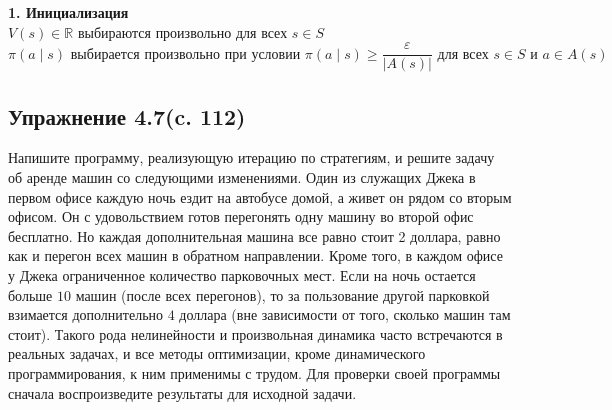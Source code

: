 \begin{solution}
    \vspace{5mm}

    \textbf{1. Инициализация}\\
    $V(s) \in \mathbb{R} \text{ выбираются произвольно для всех } s \in S$\\
    $\pi(a \mid s) \text{ выбирается произвольно при условии }
    \pi(a \mid s) \ge \dfrac{\varepsilon}{|A(s)|}
    \text{ для всех } s \in S \text{ и } a \in A(s)$
\end{solution}

\subsection{Упражнение 4.7(c. 112)}
Напишите программу, реализующую итерацию по стратегиям, и решите задачу об аренде машин со следующими изменениями. Один из служащих Джека в первом офисе каждую ночь ездит на автобусе домой, а живет он рядом со вторым офисом. Он с удовольствием готов
перегонять одну машину во второй офис бесплатно. Но каждая дополнительная машина все равно стоит 2 доллара, равно как и перегон всех машин в обратном направлении. Кроме того, в  каждом офисе у  Джека ограниченное количество парковочных мест. Если на ночь остается больше $10$ машин (после всех перегонов), то за пользование другой парковкой взимается дополнительно $4$ доллара
(вне зависимости от того, сколько машин там стоит). Такого рода нелинейности и  произвольная динамика часто встречаются в  реальных задачах, и  все методы оптимизации, кроме динамического программирования, к ним применимы с трудом. Для проверки своей программы сначала воспроизведите результаты
для исходной задачи.
